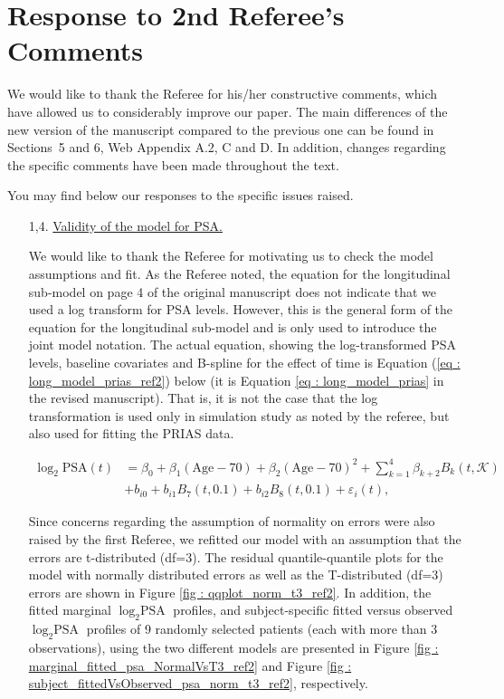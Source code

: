 \clearpage
\section*{Response to 2nd Referee's Comments}
We would like to thank the Referee for his/her constructive comments, which have allowed us to considerably improve our paper. The main differences of the new version of the manuscript compared to the previous one can be found in Sections~5 and 6, Web Appendix A.2, C and D. In addition, changes regarding the specific comments have been made throughout the text.

You may find below our responses to the specific issues raised.

\begin{enumerate}
    \item [1,4.] \underline{Validity of the model for PSA.}

    We would like to thank the Referee for motivating us to check the model assumptions and fit. As the Referee noted, the equation for the longitudinal sub-model on page 4 of the original manuscript does not indicate that we used a log transform for PSA levels. However, this is the general form of the equation for the longitudinal sub-model and is only used to introduce the joint model notation. The actual equation, showing the log-transformed PSA levels, baseline covariates and B-spline for the effect of time is Equation (\ref{eq : long_model_prias_ref2}) below (it is Equation \ref{eq : long_model_prias} in the revised manuscript). That is, it is not the case that the log transformation is used only in simulation study as noted by the referee, but also used for fitting the PRIAS data. 

    \begin{equation}
\label{eq : long_model_prias_ref2}
\begin{aligned}
\log_2 \mbox{PSA}(t) &= \beta_0 + \beta_1 (\mbox{Age}-70) + \beta_2 (\mbox{Age}-70)^2 + \sum_{k=1}^4 \beta_{k+2} B_k(t,\mathcal{K})\\ 
&+  b_{i0} + b_{i1} B_7(t, 0.1) + b_{i2} B_8(t, 0.1) +
\varepsilon_i(t),
\end{aligned}
\end{equation}

    Since concerns regarding the assumption of normality on errors were also raised by the first Referee, we refitted our model with an assumption that the errors are t-distributed (df=3). The residual quantile-quantile plots for the model with normally distributed errors as well as the T-distributed (df=3) errors are shown in Figure \ref{fig : qqplot_norm_t3_ref2}. In addition, the fitted marginal $\log_2 \mbox{PSA}$ profiles, and subject-specific fitted versus observed $\log_2 \mbox{PSA}$ profiles of 9 randomly selected patients (each with more than 3 observations), using the two different models are presented in Figure \ref{fig : marginal_fitted_psa_NormalVsT3_ref2} and Figure \ref{fig : subject_fittedVsObserved_psa_norm_t3_ref2}, respectively.


\end{enumerate}
